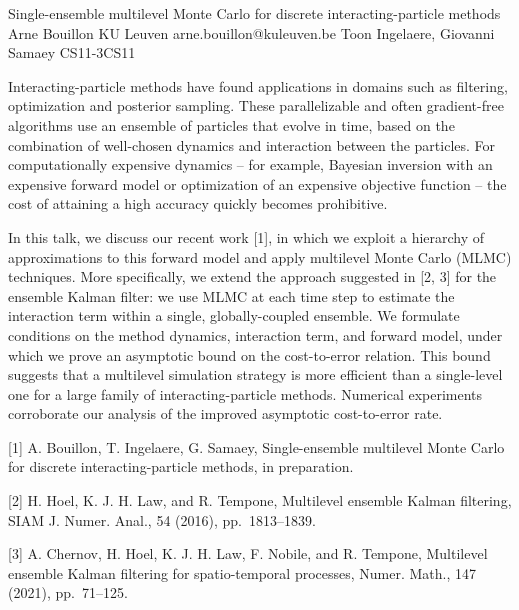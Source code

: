 \begin{talk}
  {Single-ensemble multilevel Monte Carlo for discrete interacting-particle methods}%
  {Arne Bouillon}%
  {KU Leuven}%
  {arne.bouillon@kuleuven.be}%
  {Toon Ingelaere, Giovanni Samaey}%
{}{}{CS11-3}{CS11}


Interacting-particle methods have found applications in domains such as filtering, optimization and posterior sampling. These parallelizable and often gradient-free algorithms use an ensemble of particles that evolve in time, based on the combination of well-chosen dynamics and interaction between the particles. For computationally expensive dynamics -- for example, Bayesian inversion with an expensive forward model or optimization of an expensive objective function -- the cost of attaining a high accuracy quickly becomes prohibitive.

In this talk, we discuss our recent work [1], in which we exploit a hierarchy of approximations to this forward model and apply multilevel Monte Carlo (MLMC) techniques. More specifically, we extend the approach suggested in [2, 3] for the ensemble Kalman filter: we use MLMC at each time step to estimate the interaction term within a single, globally-coupled ensemble. We formulate conditions on the method dynamics, interaction term, and forward model, under which we prove an asymptotic bound on the cost-to-error relation. This bound suggests that a multilevel simulation strategy is more efficient than a single-level one for a large family of interacting-particle methods. Numerical experiments corroborate our analysis of the improved asymptotic cost-to-error rate.

\medskip

[1] A. Bouillon, T. Ingelaere, G. Samaey, Single-ensemble multilevel Monte Carlo for discrete interacting-particle methods, in preparation.

[2] H. Hoel, K. J. H. Law, and R. Tempone, Multilevel ensemble Kalman filtering, SIAM J. Numer. Anal., 54 (2016), pp.\ 1813--1839.

[3] A. Chernov, H. Hoel, K. J. H. Law, F. Nobile, and R. Tempone, Multilevel ensemble Kalman filtering for spatio-temporal processes, Numer. Math., 147 (2021), pp.\ 71--125.
\end{talk}

